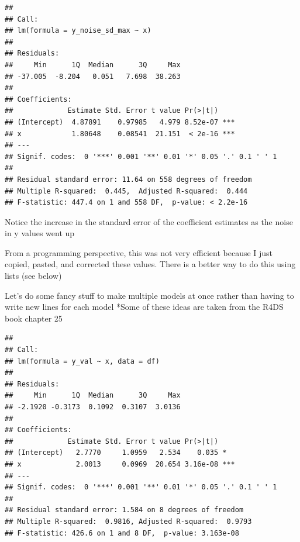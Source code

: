 \documentclass[
]{book}
\newenvironment{Shaded}{\begin{snugshade}}{\end{snugshade}}
\newcommand{\AttributeTok}[1]{\textcolor[rgb]{0.77,0.63,0.00}{#1}}
\newcommand{\ControlFlowTok}[1]{\textcolor[rgb]{0.13,0.29,0.53}{\textbf{#1}}}
\newcommand{\DecValTok}[1]{\textcolor[rgb]{0.00,0.00,0.81}{#1}}
\newcommand{\FunctionTok}[1]{\textcolor[rgb]{0.00,0.00,0.00}{#1}}
\newcommand{\NormalTok}[1]{#1}
\newcommand{\OtherTok}[1]{\textcolor[rgb]{0.56,0.35,0.01}{#1}}
\newcommand{\SpecialCharTok}[1]{\textcolor[rgb]{0.00,0.00,0.00}{#1}}
\begin{document}
\begin{verbatim}
## 
## Call:
## lm(formula = y_noise_sd_max ~ x)
## 
## Residuals:
##     Min      1Q  Median      3Q     Max 
## -37.005  -8.204   0.051   7.698  38.263 
## 
## Coefficients:
##             Estimate Std. Error t value Pr(>|t|)    
## (Intercept)  4.87891    0.97985   4.979 8.52e-07 ***
## x            1.80648    0.08541  21.151  < 2e-16 ***
## ---
## Signif. codes:  0 '***' 0.001 '**' 0.01 '*' 0.05 '.' 0.1 ' ' 1
## 
## Residual standard error: 11.64 on 558 degrees of freedom
## Multiple R-squared:  0.445,  Adjusted R-squared:  0.444 
## F-statistic: 447.4 on 1 and 558 DF,  p-value: < 2.2e-16
\end{verbatim}

Notice the increase in the standard error of the coefficient estimates as the noise in y values went up

From a programming perspective, this was not very efficient because I just copied, pasted, and corrected these values.
There is a better way to do this using lists (see below)

Let's do some fancy stuff to make multiple models at once rather than having to write new lines for each model
*Some of these ideas are taken from the R4DS book chapter 25

\begin{Shaded}
\end{Shaded}

\begin{verbatim}
## 
## Call:
## lm(formula = y_val ~ x, data = df)
## 
## Residuals:
##     Min      1Q  Median      3Q     Max 
## -2.1920 -0.3173  0.1092  0.3107  3.0136 
## 
## Coefficients:
##             Estimate Std. Error t value Pr(>|t|)    
## (Intercept)   2.7770     1.0959   2.534    0.035 *  
## x             2.0013     0.0969  20.654 3.16e-08 ***
## ---
## Signif. codes:  0 '***' 0.001 '**' 0.01 '*' 0.05 '.' 0.1 ' ' 1
## 
## Residual standard error: 1.584 on 8 degrees of freedom
## Multiple R-squared:  0.9816, Adjusted R-squared:  0.9793 
## F-statistic: 426.6 on 1 and 8 DF,  p-value: 3.163e-08
\end{verbatim}
\end{document}
